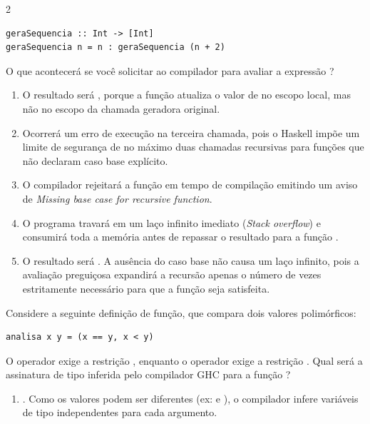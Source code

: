 \documentclass[a4paper,10pt,brazil]{article}
\begin{document}
\begin{multicols}{2}
\begin{verbatim}
geraSequencia :: Int -> [Int]
geraSequencia n = n : geraSequencia (n + 2)
\end{verbatim}

O que acontecerá se você solicitar ao compilador para avaliar a expressão ?

\begin{enumerate}
  \item O resultado será \haskellinline{[10, 10, 10]}, porque a função atualiza o valor de  no escopo local, mas não no escopo da chamada geradora original.

  \item Ocorrerá um erro de execução na terceira chamada, pois o Haskell impõe um limite de segurança de no máximo duas chamadas recursivas para funções que não declaram caso base explícito.
  \item O compilador rejeitará a função  em tempo de compilação emitindo um aviso de \emph{Missing base case for recursive function}.

  \item O programa travará em um laço infinito imediato (\emph{Stack overflow}) e consumirá toda a memória antes de repassar o resultado para a função .

  \item O resultado será \haskellinline{[10, 12, 14]}. A ausência do caso base não causa um laço infinito, pois a avaliação preguiçosa expandirá a recursão apenas o número de vezes estritamente necessário para que a função  seja satisfeita.


\end{enumerate}

Considere a seguinte definição de função, que compara dois valores polimórficos:
\begin{verbatim}
analisa x y = (x == y, x < y)
\end{verbatim}
O operador \haskellinline{==} exige a restrição , enquanto o operador \haskellinline{<} exige a restrição . Qual será a assinatura de tipo inferida pelo compilador GHC para a função ?

\begin{enumerate}
  \item {}. Como os valores podem ser diferentes (ex:  e ), o compilador infere variáveis de tipo independentes para cada argumento.


\end{enumerate}
\end{multicols}
\end{document}
